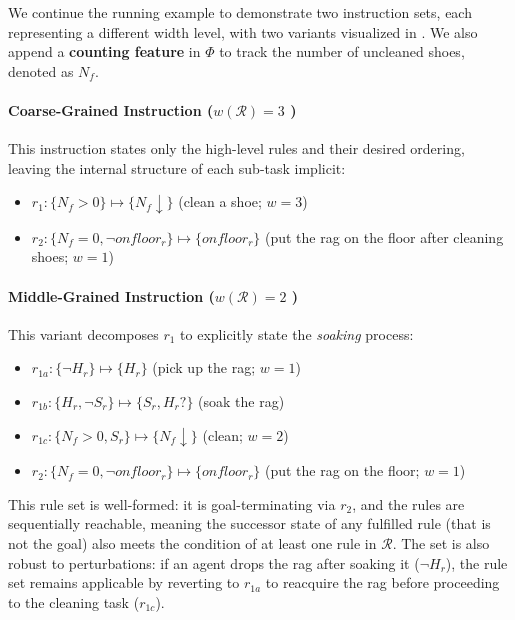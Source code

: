\documentclass[11pt]{article}
\begin{document}
We continue the running example to demonstrate two instruction sets, each representing a different width level, with two variants visualized in . We also append a \textbf{counting feature} in $\Phi$ to track the number of uncleaned shoes, denoted as $N_f$.

\paragraph{Coarse-Grained Instruction ($w(\mathcal R) = 3$ )} This instruction states only the high-level rules and their desired ordering, leaving the internal structure of each sub-task implicit:
\begin{itemize}[leftmargin=*]
    \item $r_1 : \{N_f > 0\} \mapsto \{N_f \downarrow\}$ (clean a shoe; $w=3$)
    \item $r_2 : \{N_f = 0, \neg onfloor_{r}\} \mapsto \{onfloor_{r}\}$ (put the rag on the floor after cleaning shoes; $w=1$)
\end{itemize}


\paragraph{Middle-Grained Instruction ($w(\mathcal R) = 2$ )} This variant decomposes $r_1$ to explicitly state the \emph{soaking} process:
\begin{itemize}[leftmargin=*]
    \item $r_{1a} : \{\neg H_r\} \mapsto \{H_r\}$ (pick up the rag; $w = 1$)
    \item $r_{1b} : \{H_r, \neg S_r \} \mapsto \{S_r, H_r?\}$ (soak the rag)
    \item $r_{1c} : \{N_f > 0, S_r \} \mapsto \{N_f \downarrow\}$ (clean; $w = 2$)
    \item $r_2 : \{N_f = 0, \neg onfloor_{r}\} \mapsto \{onfloor_{r}\}$ (put the rag on the floor; $w = 1$)
\end{itemize}
This rule set is well-formed: it is goal-terminating via $r_2$, and the rules are sequentially reachable, meaning the successor state of any fulfilled rule (that is not the goal) also meets the condition of at least one rule in $\mathcal{R}$. The set is also robust to perturbations: if an agent drops the rag after soaking it ($\neg H_r$), the rule set remains applicable by reverting to $r_{1a}$ to reacquire the rag before proceeding to the cleaning task ($r_{1c}$). 
\end{document}

